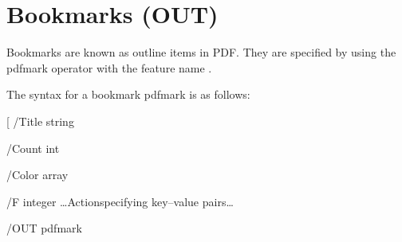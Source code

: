 \documentclass[letterpaper,12pt,english,openany,oneside]{sphinxmanual}
\begin{document}
\begin{sphinxVerbatim}[commandchars=\\\{\}]
\PYG{p}{[}     
      
           
       
     \PYG{p}{[}     \PYG{p}{]}
     
     
\PYG{p}{[}     
     \PYG{p}{[}   \PYG{p}{]}
     
     
\end{sphinxVerbatim}


\section{Bookmarks (OUT)}
\label{\detokenize{pdfmark_Basic:bookmarks-out}}
Bookmarks are known as outline items in PDF. They are specified by using the pdfmark operator with the feature name  .

The syntax for a bookmark pdfmark is as follows:

\begin{sphinxVerbatim}[commandchars=\\\{\}]
 [ /Title
string

        /Count
int

        /Color
array

        /F
integer
        …Action\PYGZhy{}specifying key–value pairs…

        /OUT pdfmark
\end{sphinxVerbatim}

\end{document}
